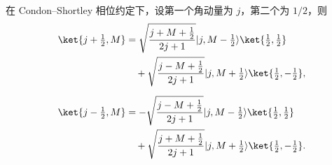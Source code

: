 \begin{proposition}
在 Condon--Shortley 相位约定下，设第一个角动量为 $j$，第二个为 $1/2$，则
\begin{align}
\ket{j+\tfrac12,M}
&=
\sqrt{\frac{j+M+\tfrac12}{2j+1}}
\lvert j,M-\tfrac12\rangle\ket{\tfrac12,\tfrac12}
\nonumber\\
&\quad+
\sqrt{\frac{j-M+\tfrac12}{2j+1}}
\lvert j,M+\tfrac12\rangle\ket{\tfrac12,-\tfrac12},
\label{eq:cg-j-half-plus}\\[2mm]
\ket{j-\tfrac12,M}
&=
-\sqrt{\frac{j-M+\tfrac12}{2j+1}}
\lvert j,M-\tfrac12\rangle\ket{\tfrac12,\tfrac12}
\nonumber\\
&\quad+
\sqrt{\frac{j+M+\tfrac12}{2j+1}}
\lvert j,M+\tfrac12\rangle\ket{\tfrac12,-\tfrac12}.
\label{eq:cg-j-half-minus}
\end{align}
\end{proposition}
